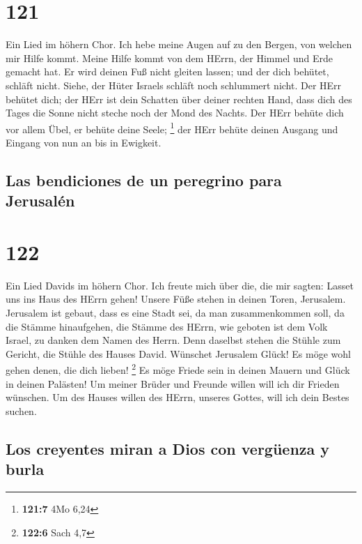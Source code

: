 \hypertarget{section-120}{%
\section{121}\label{section-120}}

 Ein Lied im höhern Chor. Ich hebe meine Augen auf zu den
Bergen, von welchen mir Hilfe kommt.  Meine Hilfe kommt
von dem HErrn, der Himmel und Erde gemacht hat.  Er wird
deinen Fuß nicht gleiten lassen; und der dich behütet, schläft nicht.
 Siehe, der Hüter Israels schläft noch schlummert nicht.
 Der HErr behütet dich; der HErr ist dein Schatten über
deiner rechten Hand,  dass dich des Tages die Sonne nicht
steche noch der Mond des Nachts.  Der HErr behüte dich vor
allem Übel, er behüte deine Seele; \footnote{\textbf{121:7} 4Mo 6,24}
 der HErr behüte deinen Ausgang und Eingang von nun an bis
in Ewigkeit.

\hypertarget{las-bendiciones-de-un-peregrino-para-jerusaluxe9n}{%
\subsection{Las bendiciones de un peregrino para
Jerusalén}\label{las-bendiciones-de-un-peregrino-para-jerusaluxe9n}}

\hypertarget{section-121}{%
\section{122}\label{section-121}}

 Ein Lied Davids im höhern Chor. Ich freute mich über die,
die mir sagten: Lasset uns ins Haus des HErrn gehen! 
Unsere Füße stehen in deinen Toren, Jerusalem.  Jerusalem
ist gebaut, dass es eine Stadt sei, da man zusammenkommen soll,
 da die Stämme hinaufgehen, die Stämme des HErrn, wie
geboten ist dem Volk Israel, zu danken dem Namen des Herrn.
 Denn daselbst stehen die Stühle zum Gericht, die Stühle
des Hauses David.  Wünschet Jerusalem Glück! Es möge wohl
gehen denen, die dich lieben! \footnote{\textbf{122:6} Sach 4,7}
 Es möge Friede sein in deinen Mauern und Glück in deinen
Palästen!  Um meiner Brüder und Freunde willen will ich
dir Frieden wünschen.  Um des Hauses willen des HErrn,
unseres Gottes, will ich dein Bestes suchen.

\hypertarget{los-creyentes-miran-a-dios-con-verguxfcenza-y-burla}{%
\subsection{Los creyentes miran a Dios con vergüenza y
burla}\label{los-creyentes-miran-a-dios-con-verguxfcenza-y-burla}}

